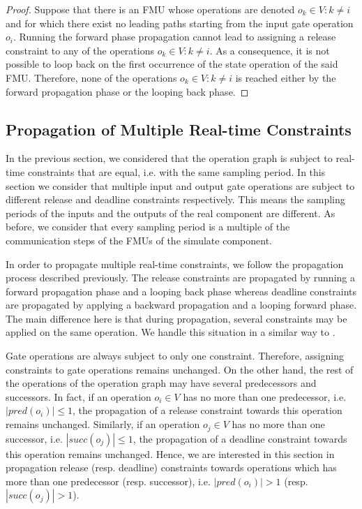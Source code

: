 \begin{proof}
Suppose that there is an FMU whose operations are denoted $o_k \in  V : k \neq i$ and for which there exist no leading paths starting from the input gate operation $o_i$. Running the forward phase propagation cannot lead to assigning a release constraint to any of the operations $o_k \in  V : k \neq i$. As a consequence, it is not possible to loop back on the first occurrence of the state operation of the said FMU. Therefore, none of the operations $o_k \in  V : k \neq i$ is reached either by the forward propagation phase or the looping back phase.      
\end{proof}

\subsection{Propagation of Multiple Real-time Constraints}

In the previous section, we considered that the operation graph is subject to real-time constraints that are equal, i.e. with the same sampling period. In this section we consider that multiple input and output gate operations are subject to different release and deadline constraints respectively. This means the sampling periods of the inputs and the outputs of the real component are different. As before, we consider that every sampling period is a multiple of the communication steps of the FMUs of the simulate component.

In order to propagate multiple real-time constraints, we follow the propagation process described previously. The release constraints are propagated by running a forward propagation phase and a looping back phase whereas deadline constraints are propagated by applying a backward propagation and a looping forward phase. The main difference here is that during propagation, several constraints may be applied on the same operation. We handle this situation in a similar way to \cite{faure:2011}.

Gate operations are always subject to only one constraint. Therefore, assigning constraints to gate operations remains unchanged. On the other hand, the rest of the operations of the operation graph may have several predecessors and successors. In fact, if an operation $o_i \in V$ has no more than one predecessor, i.e. $|pred(o_i)| \leq 1$, the propagation of a release constraint towards this operation remains unchanged. Similarly, if an operation $o_j \in V$ has no more than one successor, i.e. $|succ(o_j)| \leq 1$, the propagation of a deadline constraint towards this operation remains unchanged. Hence, we are interested in this section in propagation release (resp. deadline) constraints towards operations which has more than one predecessor (resp. successor), i.e. $|pred(o_i)| > 1$ (resp. $|succ(o_j)| > 1$). 

